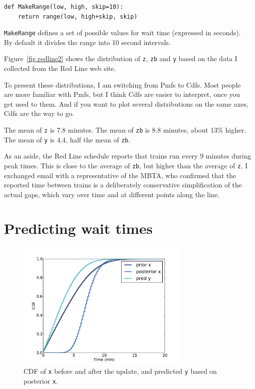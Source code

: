\documentclass[12pt]{book}
\begin{document}
\begin{verbatim}
def MakeRange(low, high, skip=10):
    return range(low, high+skip, skip)
\end{verbatim}

{\tt MakeRange} defines a set of possible values for wait time
(expressed in seconds).  By default it divides the range into 
10 second intervals.

Figure~\ref{fig.redline2} shows the distribution of {\tt z}, {\tt zb}
and {\tt y} based on the data I collected from the Red Line web site.

To present these distributions, I am switching from Pmfs to Cdfs.
Most people are more familiar with Pmfs, but I think Cdfs are easier
to interpret, once you get used to them.  And if you want to plot
several distributions on the same axes, Cdfs are the way to go.

The mean of {\tt z} is 7.8 minutes.  The mean of {\tt zb} is 8.8
minutes, about 13\% higher.  The mean of {\tt y} is 4.4, half
the mean of {\tt zb}.

As an aside, the Red Line schedule reports that trains run every
9 minutes during peak times.  This is close to the average of
{\tt zb}, but higher than the average of {\tt z}.  I exchanged email
with a representative of the MBTA, who confirmed that the reported
time between trains is a deliberately conservative simplification
of the actual gaps, which vary over time and at different
points along the line.


\section{Predicting wait times}
\label{elapsed}

\begin{figure}
\centerline{\includegraphics[height=2.5in]{figs/redline3.pdf}}
\caption{CDF of {\tt x} before and after the update, and predicted
{\tt y} based on posterior {\tt x}. }
\label{fig.redline3}
\end{figure}
\end{document}
